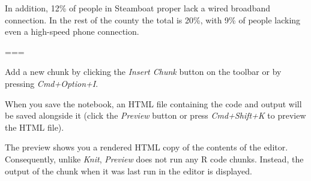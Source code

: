\documentclass[]{article}
\newenvironment{Shaded}{\begin{snugshade}}{\end{snugshade}}
\newcommand{\KeywordTok}[1]{\textcolor[rgb]{0.13,0.29,0.53}{\textbf{#1}}}
\newcommand{\NormalTok}[1]{#1}
\newcommand{\OperatorTok}[1]{\textcolor[rgb]{0.81,0.36,0.00}{\textbf{#1}}}
\newcommand{\StringTok}[1]{\textcolor[rgb]{0.31,0.60,0.02}{#1}}
\begin{document}
\begin{Shaded}
\end{Shaded}

In addition, 12\% of people in Steamboat proper lack a wired broadband
connection. In the rest of the county the total is 20\%, with 9\% of
people lacking even a high-speed phone connection.

===

Add a new chunk by clicking the \emph{Insert Chunk} button on the
toolbar or by pressing \emph{Cmd+Option+I}.

When you save the notebook, an HTML file containing the code and output
will be saved alongside it (click the \emph{Preview} button or press
\emph{Cmd+Shift+K} to preview the HTML file).

The preview shows you a rendered HTML copy of the contents of the
editor. Consequently, unlike \emph{Knit}, \emph{Preview} does not run
any R code chunks. Instead, the output of the chunk when it was last run
in the editor is displayed.
\end{document}
